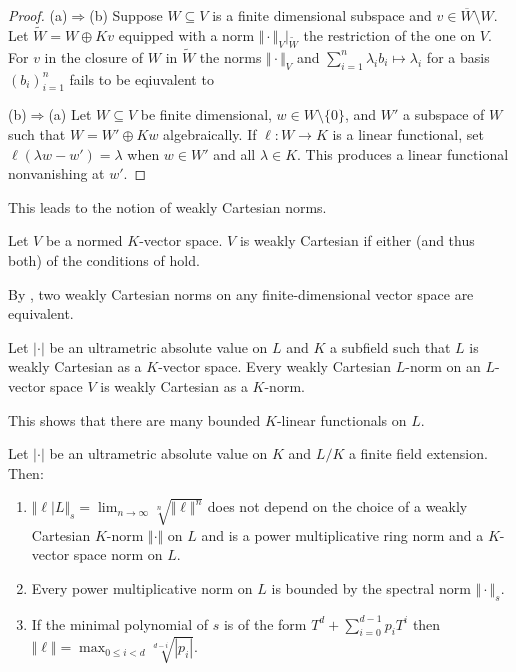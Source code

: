 \begin{proof}
   (a)$\Rightarrow$(b) Suppose $W\subseteq V$ is a finite dimensional subspace and $v\in\overline{W}\setminus W$. Let $\widetilde{W}=W\oplus Kv$ equipped with a norm $\Vert \cdot\Vert_{V}|_{\widetilde{W}}$ the restriction of the one on $V$. For $v$ in the closure of $W$ in $\widetilde{W}$ the norms $\Vert\cdot\Vert_{V}$ and $\sum_{i=1}^{n}\lambda_{i}b_{i}\mapsto \lambda_{i}$ for a basis $(b_{i})_{i=1}^{n}$ fails to be eqiuvalent to 

   (b)$\Rightarrow$(a) Let $W\subseteq V$ be finite dimensional, $w\in W\setminus\{0\}$, and $W'$ a subspace of $W$ such that $W=W'\oplus K w$ algebraically. If $\ell:W\to K$ is a linear functional, set $\ell(\lambda w-w')=\lambda$ when $w\in W'$ and all $\lambda\in K$. This produces a linear functional nonvanishing at $w'$. 
\end{proof}
This leads to the notion of weakly Cartesian norms. 
\begin{definition}\label{def: weakly Cartesian norm}
    Let $V$ be a normed $K$-vector space. $V$ is weakly Cartesian if either (and thus both) of the conditions of  hold. 
\end{definition}
\begin{remark}
    By , two weakly Cartesian norms on any finite-dimensional vector space are equivalent. 
\end{remark}
\begin{lemma}
    Let $|\cdot|$ be an ultrametric absolute value on $L$ and $K$ a subfield such that $L$ is weakly Cartesian as a $K$-vector space. Every weakly Cartesian $L$-norm on an $L$-vector space $V$ is weakly Cartesian as a $K$-norm. 
\end{lemma}
This shows that there are many bounded $K$-linear functionals on $L$. 
\begin{proposition}
    Let $|\cdot|$ be an ultrametric absolute value on $K$ and $L/K$ a finite field extension. Then: 
    \begin{enumerate}[label=(\roman*)]
        \item $\Vert\ell|L\Vert_{s}=\lim_{n\to\infty}\sqrt[n]{\Vert\ell\Vert^{n}}$ does not depend on the choice of a weakly Cartesian $K$-norm $\Vert\cdot\Vert$ on $L$ and is a power multiplicative ring norm and a $K$-vector space norm on $L$. 
        \item Every power multiplicative norm on $L$ is bounded by the spectral norm $\Vert\cdot\Vert_{s}$. 
        \item If the minimal polynomial of $s$ is of the form $T^{d}+\sum_{i=0}^{d-1}p_{i}T^{i}$ then $\Vert\ell\Vert=\max_{0\leq i<d}\sqrt[d-i]{|p_{i}|}$. 
    \end{enumerate}
\end{proposition}
